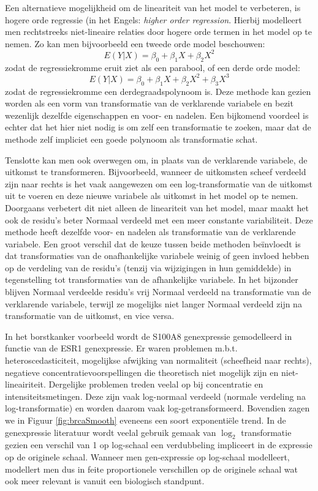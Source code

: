 \documentclass[12pt,dutch,coursenotes]{book}
\theoremstyle{definition}
\theoremstyle{definition}
\theoremstyle{definition}
\theoremstyle{remark}
\begin{document}
Een alternatieve mogelijkheid om de lineariteit van het model te
verbeteren, is hogere orde regressie (in het Engels: \emph{higher order
regression}. Hierbij modelleert men rechtstreeks niet-lineaire relaties
door hogere orde termen in het model op te nemen. Zo kan men
bijvoorbeeld een tweede orde model beschouwen:
\[E(Y|X)=\beta_0+\beta_1X+\beta_2X^2\] zodat de regressiekromme eruit
ziet als een parabool, of een derde orde model:
\[E(Y|X)=\beta_0+\beta_1X+\beta_2X^2+\beta_3X^3\] zodat de
regressiekromme een derdegraadspolynoom is. Deze methode kan gezien
worden als een vorm van transformatie van de verklarende variabele en
bezit wezenlijk dezelfde eigenschappen en voor- en nadelen. Een
bijkomend voordeel is echter dat het hier niet nodig is om zelf een
transformatie te zoeken, maar dat de methode zelf impliciet een goede
polynoom als transformatie schat.

Tenslotte kan men ook overwegen om, in plaats van de verklarende
variabele, de uitkomst te transformeren. Bijvoorbeeld, wanneer de
uitkomsten scheef verdeeld zijn naar rechts is het vaak aangewezen om
een log-transformatie van de uitkomst uit te voeren en deze nieuwe
variabele als uitkomst in het model op te nemen. Doorgaans verbetert dit
niet alleen de lineariteit van het model, maar maakt het ook de residu's
beter Normaal verdeeld met een meer constante variabiliteit. Deze
methode heeft dezelfde voor- en nadelen als transformatie van de
verklarende variabele. Een groot verschil dat de keuze tussen beide
methoden beïnvloedt is dat transformaties van de onafhankelijke
variabele weinig of geen invloed hebben op de verdeling van de residu's
(tenzij via wijzigingen in hun gemiddelde) in tegenstelling tot
transformaties van de afhankelijke variabele. In het bijzonder blijven
Normaal verdeelde residu's vrij Normaal verdeeld na transformatie van de
verklarende variabele, terwijl ze mogelijks niet langer Normaal verdeeld
zijn na transformatie van de uitkomst, en vice versa.

In het borstkanker voorbeeld wordt de S100A8 genexpressie gemodelleerd
in functie van de ESR1 genexpressie. Er waren problemen m.b.t.
heteroscedasticiteit, mogelijkse afwijking van normaliteit (scheefheid
naar rechts), negatieve concentratievoorspellingen die theoretisch niet
mogelijk zijn en niet-lineairiteit. Dergelijke problemen treden veelal
op bij concentratie en intensiteitsmetingen. Deze zijn vaak log-normaal
verdeeld (normale verdeling na log-transformatie) en worden daarom vaak
log-getransformeerd. Bovendien zagen we in Figuur \ref{fig:brcaSmooth}
eveneens een soort exponentiële trend. In de genexpressie literatuur
wordt veelal gebruik gemaak van \(\log_2\) transformatie gezien een
verschil van 1 op log-schaal een verdubbeling impliceert in de expressie
op de originele schaal. Wanneer men gen-expressie op log-schaal
modelleert, modellert men dus in feite proportionele verschillen op de
originele schaal wat ook meer relevant is vanuit een biologisch
standpunt.
\end{document}
